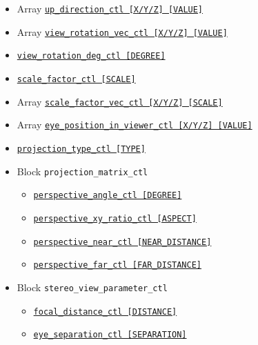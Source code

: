 \begin{itemize}
\begin{itemize}
					{\tt eye\_position\_ctl   [X/Y/Z]     [VALUE]}
			\item Array \hyperref[href_t:up_direction_ctl]
					{\tt up\_direction\_ctl   [X/Y/Z]     [VALUE]}
			\item Array \hyperref[href_t:view_rotation_vec_ctl]
					{\tt view\_rotation\_vec\_ctl   [X/Y/Z]     [VALUE]}
			\item \hyperref[href_t:view_rotation_deg_ctl]
					{\tt view\_rotation\_deg\_ctl     [DEGREE]}
			\item \hyperref[href_t:scale_factor_ctl]
					{\tt scale\_factor\_ctl     [SCALE]}
			\item Array \hyperref[href_t:scale_factor_vec_ctl]
					{\tt scale\_factor\_vec\_ctl  [X/Y/Z]     [SCALE]}
			\item Array \hyperref[href_t:eye_position_in_viewer_ctl]
					{\tt eye\_position\_in\_viewer\_ctl   [X/Y/Z]    [VALUE]}
%
			\item \hyperref[href_t:projection_type_ctl]
					{\tt projection\_type\_ctl   [TYPE]}
%
   			\item Block \verb|projection_matrix_ctl|
						\label{href_i:projection_matrix_ctl}
				\begin{itemize}
					\item \hyperref[href_t:perspective_angle_ctl]
							{\tt perspective\_angle\_ctl   [DEGREE]}
					\item \hyperref[href_t:perspective_xy_ratio_ctl]
							{\tt perspective\_xy\_ratio\_ctl   [ASPECT]}
					\item \hyperref[href_t:perspective_near_ctl]
							{\tt perspective\_near\_ctl   [NEAR\_DISTANCE]}
					\item \hyperref[href_t:perspective_far_ctl]
							{\tt perspective\_far\_ctl   [FAR\_DISTANCE]}
%
				\end{itemize}
%
    			\item Block \verb|stereo_view_parameter_ctl|
						\label{href_i:stereo_view_parameter_ctl}
				\begin{itemize}
					\item \hyperref[href_t:focal_distance_ctl]
							{\tt focal\_distance\_ctl   [DISTANCE]}
					\item \hyperref[href_t:eye_separation_ctl]
							{\tt eye\_separation\_ctl   [SEPARATION]}

\end{itemize}
\end{itemize}
\end{itemize}
